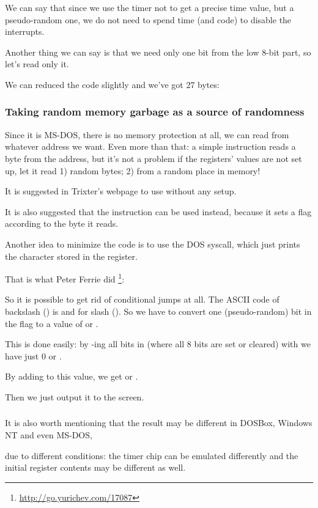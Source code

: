 We can say that since we use the timer not 
to get a precise time value, but a pseudo-random one, we do not need
to spend time (and code) to disable the interrupts.

Another thing we can say is that we need only one bit from the low 8-bit part, so let's read only it.

We can reduced the code slightly and we've got 27 bytes:



\subsubsection{
Taking random memory garbage as a source of randomness}

Since it is MS-DOS, there is no memory protection at all, we can read from whatever address we want.
Even more than that: a simple  
instruction reads a byte from the  address, but it's not a problem
if the registers' values are not set up, let it read 1) random bytes; 2) from a random place in memory!

It is suggested in Trixter's webpage\FNURLTRIXTER 
to use  without any setup.

It is also suggested that the  
instruction can be used instead, because it sets a flag according to the byte it reads.

Another idea to minimize the code is to use the  DOS syscall, which just prints the character stored in the  register.

That is what Peter Ferrie did
\footnote{\url{http://go.yurichev.com/17087}}:



So it is possible to get rid of conditional jumps at all.
The \ac{ASCII} code of backslash (\q{\textbackslash{}}) 
is  and  for slash (\q{/}).
So we have to convert one (pseudo-random) bit in the  flag to a value of  or .

This is done easily: by -ing all bits in  (where all 8 bits are set or cleared) with  we have just 0 or .

By adding  to this value, we get  or .

Then we just output it to the screen.

\subsubsection{\Conclusion{}}

It is also worth mentioning that the result may 
be different in DOSBox, \gls{Windows NT} and even MS-DOS, 

due to different
conditions: the timer chip can be emulated differently and the initial register contents may be different as well.
